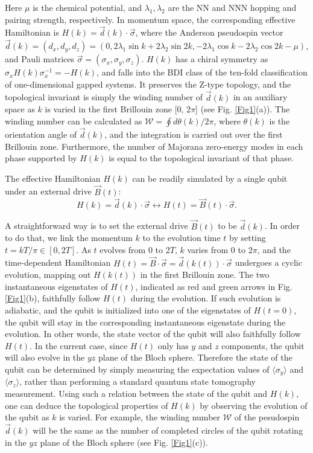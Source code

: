 \documentclass[aps,reprint,groupedaddress,showpacs,superscriptaddress]{revtex4-1}
\begin{document}
\noindent Here $\mu$ is the chemical potential, and $\lambda_1, \lambda_2$ are the NN and NNN hopping and pairing strength, respectively. In momentum space, the corresponding effective Hamiltonian is $H(k)= \vec{d}(k) \cdot \vec{\sigma}$, where the Anderson pseudospin vector $\vec{d}(k) = (d_{x}, d_{y}, d_{z}) = (0,2 \lambda_{1} \sin k+2 \lambda_{2} \sin 2 k,-2 \lambda_{1} \cos k-2 \lambda_{2} \cos 2 k - \mu)$, and Pauli matrices $\vec{\sigma} = (\sigma_{x},\sigma_{y},\sigma_{z})$. $H(k)$ has a chiral symmetry as $\sigma_{x}H(k)\sigma_{x}^{-1}=-H(k)$, and falls into the BDI class of the ten-fold classification of one-dimensional gapped systems\cite{ATI_book}. It preserves the Z-type topology, and the topological invariant is simply the winding number of $\vec{d}(k)$ in an auxiliary space as $k$ is varied in the first Brillouin zone [0, 2$\pi$] (see Fig. \ref{Fig1}(a)). The winding number can be calculated as $\mathcal{W}= \oint d \theta(k)/2\pi$, where $\theta(k)$ is the orientation angle of $\vec{d}(k)$, and the integration is carried out over the first Brillouin zone. Furthermore, the number of Majorana zero-energy modes in each phase supported by $H(k)$ is equal to the topological invariant of that phase.



The effective Hamiltonian $H(k)$ can be readily simulated by a single qubit under an external drive $\vec{B}(t)$: 
\begin{equation}\label{H_k}
H(k)=\vec{d}(k) \cdot \vec{\sigma} \leftrightarrow H(t) = \vec{B}(t) \cdot \vec{\sigma}. 
\end{equation}

\noindent A straightforward way is to set the external drive $\vec{B}(t)$ to be $\vec{d}(k)$. In order to do that, we link the momentum $k$ to the evolution time $t$ by setting $t = kT/\pi \in [0,2T]$. As $t$ evolves from 0 to 2$T$, $k$ varies from 0 to 2$\pi$, and the time-dependent Hamiltonian $H(t) =\vec{B} \cdot \vec{\sigma}=\vec{d}(k(t)) \cdot \vec{\sigma}$ undergoes a cyclic evolution, mapping out $H(k(t))$ in the first Brillouin zone. 
The two instantaneous eigenstates of $H(t)$, indicated as red and green arrows in Fig. \ref{Fig1}(b), faithfully follow $H(t)$ during the evolution. If such evolution is adiabatic, and the qubit is initialized into one of the eigenstates of $H(t=0)$, the qubit will stay in the corresponding instantaneous eigenstate during the evolution. In other words, the state vector of the qubit will also faithfully follow $H(t)$. In the current case, since $H(t)$ only has $y$ and $z$ components, the qubit will also evolve in the $yz$ plane of the Bloch sphere. Therefore the state of the qubit can be determined by simply measuring the expectation values of $\langle\sigma_{y}\rangle$ and $\langle\sigma_{z}\rangle$, rather than performing a standard quantum state tomography measurement. Using such a relation between the state of the qubit and $H(k)$, one can deduce the topological properties of $H(k)$ by observing the evolution of the qubit as $k$ is varied. For example, the winding number $\mathcal{W}$ of the pesudospin $\vec{d}(k)$ will be the same as the number of completed circles of the qubit rotating in the $yz$ plane of the Bloch sphere (see Fig. \ref{Fig1}(c)). 
\end{document}
